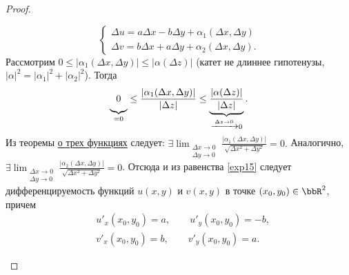 \begin{leftbar}
\begin{proof}
\begin{itemize}
\begin{equation}
\label{exp15}
\begin{cases}
\Delta u = a\Delta x - b \Delta y + \alpha_1(\Delta x, \Delta y) \\
\Delta v = b\Delta x + a \Delta y + \alpha_2(\Delta x, \Delta y).
\end{cases}
\end{equation}
Рассмотрим $0 \le |\alpha_1(\Delta x, \Delta y)| \le |\alpha(\Delta z)|$ (катет не длиннее гипотенузы, $|\alpha|^2=|\alpha_1|^2 + |\alpha_2|^2 $). Тогда
$$
\underbrace{{{\vphantom{\frac{0}{0}}}}0}_{=0} \le \frac{|\alpha_1(\Delta x, \Delta y)|}{|\Delta z|} \le \underbrace{\frac{|\alpha(\Delta z)|}{|\Delta z|}}_{\xrightarrow{\Delta z \to 0} 0 }.
$$
Из теоремы \hyperref[exp14]{о трех функциях} следует: $\exists \lim_{\substack{\Delta x \to 0\\ \Delta y \to 0}}\limits \frac{|\alpha_1(\Delta x,\Delta y)|}{\sqrt{\Delta x ^2 + \Delta y^2}} = 0.$
Аналогично, $\exists \lim_{\substack{\Delta x \to 0\\ \Delta y \to 0}}\limits \frac{|\alpha_2(\Delta x,\Delta y)|}{\sqrt{\Delta x^2 + \Delta y^2}} = 0$. 
Отсюда и из равенства \eqref{exp15} следует дифференцируемость функций $u(x,y)$ и $v(x,y)$ в точке $(x_0,y_0) \in \bbR^2$, причем 
\begin{equation}
\label{exp16}
\begin{split}
&u'_x(x_0,y_0) = a, \qquad u'_y(x_0,y_0) = -b,\\
&v'_x(x_0,y_0) = b, \qquad v'_y(x_0,y_0) = a.
\end{split}
\end{equation}


\end{itemize}
\end{proof}
\end{leftbar}
